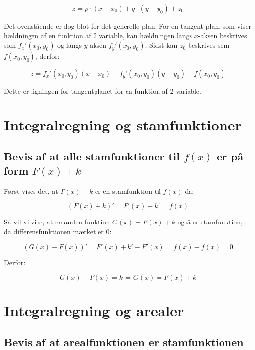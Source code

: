 \documentclass{article}
\makeatletter
\newenvironment{proofw}{\par
  \pushQED{\qed}%
  \normalfont \topsep6\p@\@plus6\p@\relax
  \trivlist
  \item[]\ignorespaces
}{%
  \popQED\endtrivlist\@endpefalse
}
\makeatother
\begin{document}
\begin{proofw}
$$
z=p \cdot (x-x_0)+q \cdot (y-y_0) + z_0
$$

Det ovenstående er dog blot for det generelle plan.
For en tangent plan, som viser hældningen af en funktion af 2 variable,
kan hældningen langs $x$-aksen beskrives som $f_x'(x_0,y_0)$
og langs $y$-aksen $f_y'(x_0,y_0)$.
Sidst kan $z_0$ beskrives som $f(x_0,y_0)$, derfor:

$$
    z=f_x'(x_0,y_0)(x-x_0)+
    f_y'(x_0,y_0)(y-y_0)+
    f(x_0,y_0)
$$

Dette er ligningen for tangentplanet for en funktion af 2 variable.

\end{proofw}

\section{Integralregning og stamfunktioner}

\subsection{Bevis af at alle stamfunktioner til $f(x)$ er på form $F(x)+k$}

\begin{proofw}
    Først vises det, at $F(x)+k$ er en stamfunktion til $f(x)$ da:

    $$
        (F(x)+k)'=F'(x)+k'=f(x)
    $$

    Så vil vi vise, at en anden funktion $G(x)=F(x)+k$ også er stamfunktion,
    da differensfunktionen mærket er 0:

    $$
        (G(x)-F(x))'=F'(x)+k'-F'(x)=f(x)-f(x)=0
    $$

    Derfor:

    $$
        G(x)-F(x)=k \Leftrightarrow G(x)=F(x)+k
    $$

\end{proofw}

\section{Integralregning og arealer}

\subsection{Bevis af at arealfunktionen er stamfunktionen}
\end{document}
